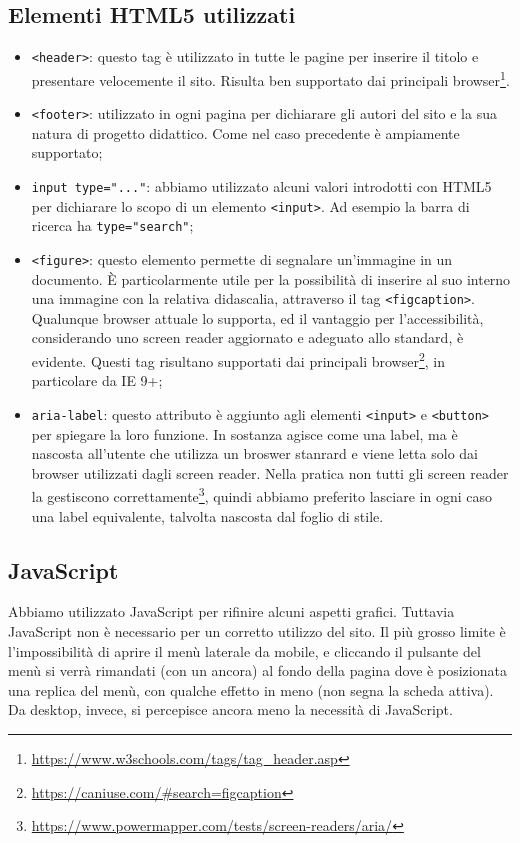 \documentclass[12pt]{article}
\newcommand{\code}[1]{\texttt{#1}}
\begin{document}
	\subsection{Elementi HTML5 utilizzati}
	\begin{itemize}
		\item \code{<header>}: questo tag è utilizzato in tutte le pagine per inserire il titolo e presentare velocemente il sito. Risulta ben supportato dai principali browser\footnote{\url{https://www.w3schools.com/tags/tag_header.asp}}.
		\item \code{<footer>}: utilizzato in ogni pagina per dichiarare gli autori del sito e la sua natura di progetto didattico. Come nel caso precedente è ampiamente supportato;
		\item \code{input type="..."}: abbiamo utilizzato alcuni valori introdotti con HTML5 per dichiarare lo scopo di un elemento \code{<input>}. Ad esempio la barra di ricerca ha \code{type="search"};
		\item \code{<figure>}: questo elemento permette di segnalare un'immagine in un documento. È particolarmente utile per la possibilità di inserire al suo interno una immagine con la relativa didascalia, attraverso il tag \code{<figcaption>}. Qualunque browser attuale lo supporta, ed il vantaggio per l'accessibilità, considerando uno screen reader aggiornato e adeguato allo standard, è evidente. Questi tag risultano supportati dai principali browser\footnote{\url{https://caniuse.com/\#search=figcaption}}, in particolare da IE 9+;
		\item \code{aria-label}: questo attributo è aggiunto agli elementi \code{<input>} e \code{<button>} per spiegare la loro funzione. In sostanza agisce come una label, ma è nascosta all'utente che utilizza un broswer stanrard e viene letta solo dai browser utilizzati dagli screen reader. Nella pratica non tutti gli screen reader la gestiscono correttamente\footnote{\url{https://www.powermapper.com/tests/screen-readers/aria/}}, quindi abbiamo preferito lasciare in ogni caso una label equivalente, talvolta nascosta dal foglio di stile.
	\end{itemize}
	
	\subsection{JavaScript}
	Abbiamo utilizzato JavaScript per rifinire alcuni aspetti grafici. Tuttavia JavaScript non è necessario per un corretto utilizzo del sito. Il più grosso limite è l'impossibilità di aprire il menù laterale da mobile, e cliccando il pulsante del menù si verrà rimandati (con un ancora) al fondo della pagina dove è posizionata una replica del menù, con qualche effetto in meno (non segna la scheda attiva). Da desktop, invece, si percepisce ancora meno la necessità di JavaScript.
	
\end{document}
